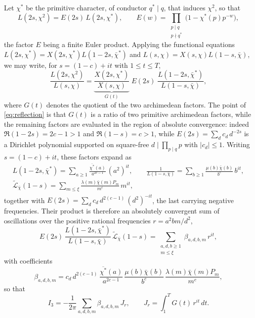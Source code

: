 \documentclass[12pt,a4paper,reqno]{amsart}
\theoremstyle{remark}
\numberwithin{equation}{section}
\begin{document}
Let $\chi^*$ be the primitive character, of conductor $q^*\mid q$, that induces $\chi^2$, so that
\[
L(2s,\chi^2)=E(2s)\,L(2s,\chi^*),
\qquad
E(w)=\prod_{\substack{p\mid q\\ p\nmid q^*}}\bigl(1-\chi^*(p)p^{-w}\bigr),
\]
the factor $E$ being a finite Euler product. Applying the functional equations $L(2s,\chi^*)=X(2s,\chi^*)L(1-2s,\bar\chi^*)$ and $L(s,\chi)=X(s,\chi)L(1-s,\bar\chi)$, we may write, for $s=(1-c)+it$ with $1\le t\le T$,
\begin{equation}\label{eq:reflection}
\frac{L(2s,\chi^2)}{L(s,\chi)}=\underbrace{\frac{X(2s,\chi^*)}{X(s,\chi)}}_{G(t)}\;E(2s)\;\frac{L(1-2s,\bar\chi^*)}{L(1-s,\bar\chi)},
\end{equation}
where $G(t)$ denotes the quotient of the two archimedean factors. The point of \eqref{eq:reflection} is that $G(t)$ is a ratio of two primitive archimedean factors, while the remaining factors are evaluated in the region of absolute convergence: indeed $\Re(1-2s)=2c-1>1$ and $\Re(1-s)=c>1$, while $E(2s)=\sum_d c_d\,d^{-2s}$ is a Dirichlet polynomial supported on square-free $d\mid\prod_{p\mid q}p$ with $|c_d|\le1$. Writing $s=(1-c)+it$, these factors expand as
\[
\begin{gathered}
L(1-2s,\bar\chi^*)=\sum_{a\ge1}\frac{\overline{\chi^*}(a)}{a^{2c-1}}\,(a^2)^{it},\qquad
\frac{1}{L(1-s,\bar\chi)}=\sum_{b\ge1}\frac{\mu(b)\bar\chi(b)}{b^{c}}\,b^{it},\\
\widetilde{\mathcal{L}}_{\bar\chi}(1-s)=\sum_{m\le\xi}\frac{\lambda(m)\bar\chi(m)P_m}{m^{c}}\,m^{it},
\end{gathered}
\]
together with $E(2s)=\sum_d c_d\,d^{2(c-1)}\,(d^{2})^{-it}$, the last carrying negative frequencies. Their product is therefore an absolutely convergent sum of oscillations over the positive rational frequencies $r=a^2bm/d^2$,
\[
E(2s)\,\frac{L(1-2s,\bar\chi^*)}{L(1-s,\bar\chi)}\,\widetilde{\mathcal{L}}_{\bar\chi}(1-s)
=\sum_{\substack{a,d,b\ge1\\ m\le\xi}}\beta_{a,d,b,m}\,r^{it},
\]
with coefficients
\[
\beta_{a,d,b,m}=c_d\,d^{2(c-1)}\,\frac{\overline{\chi^*}(a)}{a^{2c-1}}\,\frac{\mu(b)\bar\chi(b)}{b^{c}}\,\frac{\lambda(m)\bar\chi(m)P_m}{m^{c}},
\]
so that
\[
I_3=-\frac{1}{2\pi}\sum_{a,d,b,m}\beta_{a,d,b,m}\,J_r,
\qquad
J_r=\int_1^T G(t)\,r^{it}\,dt .
\]
\end{document}
